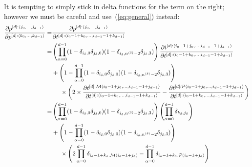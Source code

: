 \documentclass[11pt]{article}
\begin{document}
It is tempting to simply stick in delta functions for the term on the right; however we must be careful and use~(\ref{eq:general}) instead:
\begin{equation}
\begin{split}
\frac{
\partial p^{[d]: \langle j_0, \dots, j_{d-1} \rangle}
}{
\partial p^{[d]: \langle k_0, \dots, k_{d-1} \rangle}
}
=&
\frac{
\partial p^{[d]: \langle j_0, \dots, j_{d-1} \rangle}
}{
\partial t^{[d]: \langle i_0-1+k_0, \dots, i_{d-1}-1+k_{d-1} \rangle}
} \\
=&
\left ( \prod_{\alpha = 0}^{d-1} (1 - \delta_{i_\delta,0} \delta_{j_\delta,0} ) (1 - \delta_{i_\delta,n^{\langle \delta \rangle}-2} \delta_{j_\delta,3} ) \right )
\frac{
\partial t^{[d]:\langle i_0-1+j_0, \dots, i_{d-1}-1+j_{d-1} \rangle}
}{
\partial t^{[d]: \langle i_0-1+k_0, \dots, i_{d-1}-1+k_{d-1} \rangle}
} \\
& +
\left ( 1 - \prod_{\alpha = 0}^{d-1} (1 - \delta_{i_\delta,0} \delta_{j_\delta,0} ) (1 - \delta_{i_\delta,n^{\langle \delta \rangle}-2} \delta_{j_\delta,3} ) \right ) \\
& \hspace{5mm} \times
\left (
2 \times 
\frac{
\partial t^{[d]:{\cal M}\langle i_0-1+j_0, \dots, i_{d-1}-1+j_{d-1} \rangle}
}{
\partial t^{[d]: \langle i_0-1+k_0, \dots, i_{d-1}-1+k_{d-1} \rangle}
}
-
\frac{
\partial t^{[d]:{\cal P}\langle i_0-1+j_0, \dots, i_{d-1}-1+j_{d-1} \rangle}
}{
\partial t^{[d]: \langle i_0-1+k_0, \dots, i_{d-1}-1+k_{d-1} \rangle}
}
\right ) \\
=&
\left ( \prod_{\alpha = 0}^{d-1} (1 - \delta_{i_\delta,0} \delta_{j_\delta,0} ) (1 - \delta_{i_\delta,n^{\langle \delta \rangle}-2} \delta_{j_\delta,3}) \right )
\left (
\prod_{\alpha=0}^{d-1} \delta_{k_\delta, j_\delta}
\right ) \\
& +
\left ( 1 - \prod_{\alpha = 0}^{d-1} (1 - \delta_{i_\delta,0} \delta_{j_\delta,0} ) (1 - \delta_{i_\delta,n^{\langle \delta \rangle}-2} \delta_{j_\delta,3}) \right ) \\
& \hspace{5mm} \times
\left (
2 
\prod_{\alpha=0}^{d-1} \delta_{i_\delta-1+k_\delta, {\cal M}(i_\delta-1+j_\delta) }
-
\prod_{\alpha=0}^{d-1} \delta_{i_\delta-1+k_\delta, {\cal P}(i_\delta-1+j_\delta) }
\right ) 
\end{split}
\label{eq:shit}
\end{equation}
\end{document}
